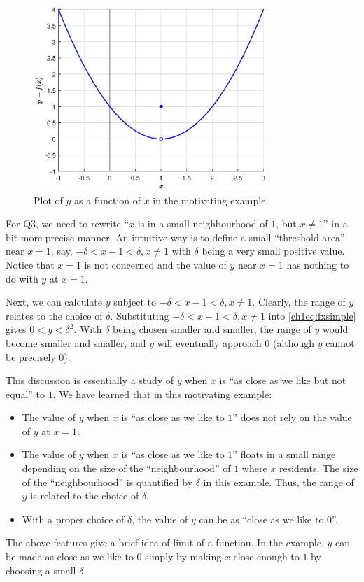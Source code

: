 \begin{figure}
\centering
\includegraphics[width=250pt]{chapters/part-1/figures/fig_fxsimple.eps}
\caption{Plot of $y$ as a function of $x$ in the motivating example.} \label{ch1fig:fxsimpleexample}
\end{figure}

For Q3, we need to rewrite ``$x$ is in a small neighbourhood of $1$, but $x \neq 1$'' in a bit more precise manner. An intuitive way is to define a small ``threshold area'' near $x=1$, say, $-\delta < x-1 < \delta, x \neq 1$ with $\delta$ being a very small positive value. Notice that $x=1$ is not concerned and the value of $y$ near $x=1$ has nothing to do with $y$ at $x=1$.

Next, we can calculate $y$ subject to $-\delta < x-1 < \delta, x \neq 1$. Clearly, the range of $y$ relates to the choice of $\delta$. Substituting $-\delta < x-1 < \delta, x \neq 1$ into \eqref{ch1eq:fxsimple} gives $0 < y < \delta^2$. With $\delta$ being chosen smaller and smaller, the range of $y$ would become smaller and smaller, and $y$ will eventually approach $0$ (although $y$ cannot be precisely $0$).

This discussion is essentially a study of $y$ when $x$ is ``as close as we like but not equal'' to $1$. We have learned that in this motivating example:
\begin{itemize}
  \item The value of $y$ when $x$ is ``as close as we like to $1$'' does not rely on the value of $y$ at $x = 1$.
  \item The value of $y$ when $x$ is ``as close as we like to $1$'' floats in a small range depending on the size of the ``neighbourhood'' of $1$ where $x$ residents. The size of the ``neighbourhood'' is quantified by $\delta$ in this example. Thus, the range of $y$ is related to the choice of $\delta$.
  \item With a proper choice of $\delta$, the value of $y$ can be as ``close as we like to $0$''.
\end{itemize}
The above features give a brief idea of limit of a function. In the example, $y$ can be made as close as we like to $0$ simply by making $x$ close enough to $1$ by choosing a small $\delta$.

